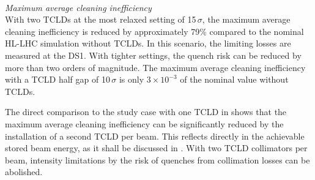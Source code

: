 \mbox{} \\ 
\textit{Maximum average cleaning inefficiency} \\
With two TCLDs at the most relaxed setting of 15$\,\sigma$, the maximum average cleaning inefficiency is reduced by approximately 79\% compared to the nominal HL-LHC simulation without TCLDs. In this scenario, the limiting losses are measured at the DS1. With tighter settings, the quench risk can be reduced by more than two orders of magnitude. The maximum average cleaning inefficiency with a TCLD half gap of 10$\,\sigma$ is only $3 \times 10^{-3}$ of the nominal value without TCLDs. 

The direct comparison to the study case with one TCLD in  shows that the maximum average cleaning inefficiency can be significantly reduced by the installation of a second TCLD per beam. This reflects directly in the achievable stored beam energy, as it shall be discussed in . With two TCLD collimators per beam, intensity limitations by the risk of quenches from collimation losses can be abolished.



